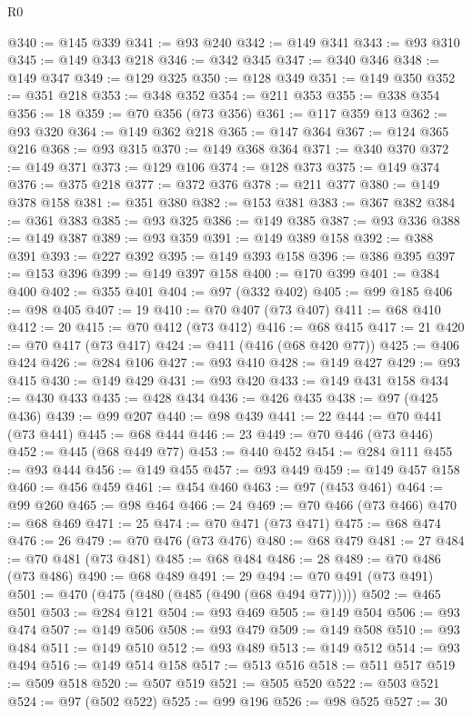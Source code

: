 \begin{lexlean}{R0}
\begin{coremodule}
@340 := @145 @339
@341 := @93 @240
@342 := @149 @341
@343 := @93 @310
@345 := @149 @343 @218
@346 := @342 @345
@347 := @340 @346
@348 := @149 @347
@349 := @129 @325
@350 := @128 @349
@351 := @149 @350
@352 := @351 @218
@353 := @348 @352
@354 := @211 @353
@355 := @338 @354
@356 := 18
@359 := @70 @356 (@73 @356)
@361 := @117 @359 @13
@362 := @93 @320
@364 := @149 @362 @218
@365 := @147 @364
@367 := @124 @365 @216
@368 := @93 @315
@370 := @149 @368 @364
@371 := @340 @370
@372 := @149 @371
@373 := @129 @106
@374 := @128 @373
@375 := @149 @374
@376 := @375 @218
@377 := @372 @376
@378 := @211 @377
@380 := @149 @378 @158
@381 := @351 @380
@382 := @153 @381
@383 := @367 @382
@384 := @361 @383
@385 := @93 @325
@386 := @149 @385
@387 := @93 @336
@388 := @149 @387
@389 := @93 @359
@391 := @149 @389 @158
@392 := @388 @391
@393 := @227 @392
@395 := @149 @393 @158
@396 := @386 @395
@397 := @153 @396
@399 := @149 @397 @158
@400 := @170 @399
@401 := @384 @400
@402 := @355 @401
@404 := @97 (@332 @402)
@405 := @99 @185
@406 := @98 @405
@407 := 19
@410 := @70 @407 (@73 @407)
@411 := @68 @410
@412 := 20
@415 := @70 @412 (@73 @412)
@416 := @68 @415
@417 := 21
@420 := @70 @417 (@73 @417)
@424 := @411 (@416 (@68 @420 @77))
@425 := @406 @424
@426 := @284 @106
@427 := @93 @410
@428 := @149 @427
@429 := @93 @415
@430 := @149 @429
@431 := @93 @420
@433 := @149 @431 @158
@434 := @430 @433
@435 := @428 @434
@436 := @426 @435
@438 := @97 (@425 @436)
@439 := @99 @207
@440 := @98 @439
@441 := 22
@444 := @70 @441 (@73 @441)
@445 := @68 @444
@446 := 23
@449 := @70 @446 (@73 @446)
@452 := @445 (@68 @449 @77)
@453 := @440 @452
@454 := @284 @111
@455 := @93 @444
@456 := @149 @455
@457 := @93 @449
@459 := @149 @457 @158
@460 := @456 @459
@461 := @454 @460
@463 := @97 (@453 @461)
@464 := @99 @260
@465 := @98 @464
@466 := 24
@469 := @70 @466 (@73 @466)
@470 := @68 @469
@471 := 25
@474 := @70 @471 (@73 @471)
@475 := @68 @474
@476 := 26
@479 := @70 @476 (@73 @476)
@480 := @68 @479
@481 := 27
@484 := @70 @481 (@73 @481)
@485 := @68 @484
@486 := 28
@489 := @70 @486 (@73 @486)
@490 := @68 @489
@491 := 29
@494 := @70 @491 (@73 @491)
@501 := @470 (@475 (@480 (@485 (@490 (@68 @494 @77)))))
@502 := @465 @501
@503 := @284 @121
@504 := @93 @469
@505 := @149 @504
@506 := @93 @474
@507 := @149 @506
@508 := @93 @479
@509 := @149 @508
@510 := @93 @484
@511 := @149 @510
@512 := @93 @489
@513 := @149 @512
@514 := @93 @494
@516 := @149 @514 @158
@517 := @513 @516
@518 := @511 @517
@519 := @509 @518
@520 := @507 @519
@521 := @505 @520
@522 := @503 @521
@524 := @97 (@502 @522)
@525 := @99 @196
@526 := @98 @525
@527 := 30

\end{coremodule}
\end{lexlean}
